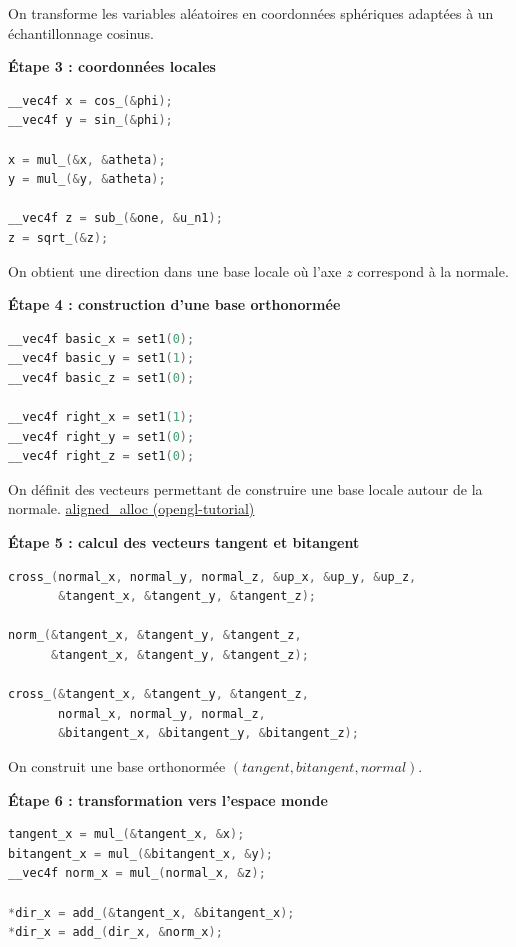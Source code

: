 On transforme les variables aléatoires en coordonnées sphériques adaptées à un échantillonnage cosinus.

\medskip

\textbf{Étape 3 : coordonnées locales}

\begin{lstlisting}[language=C]
__vec4f x = cos_(&phi);
__vec4f y = sin_(&phi);

x = mul_(&x, &atheta);
y = mul_(&y, &atheta);

__vec4f z = sub_(&one, &u_n1);
z = sqrt_(&z);
\end{lstlisting}

On obtient une direction dans une base locale où l'axe $z$ correspond à la normale.

\medskip

\textbf{Étape 4 : construction d'une base orthonormée}

\begin{lstlisting}[language=C]
__vec4f basic_x = set1(0);
__vec4f basic_y = set1(1);
__vec4f basic_z = set1(0);

__vec4f right_x = set1(1);
__vec4f right_y = set1(0);
__vec4f right_z = set1(0);
\end{lstlisting}

On définit des vecteurs permettant de construire une base locale autour de la normale.
\href{https://www.opengl-tutorial.org/fr/intermediate-tutorials/tutorial-13-normal-mapping/}{aligned\_alloc (opengl-tutorial)}

\medskip

\textbf{Étape 5 : calcul des vecteurs tangent et bitangent}

\begin{lstlisting}[language=C]
cross_(normal_x, normal_y, normal_z, &up_x, &up_y, &up_z,
       &tangent_x, &tangent_y, &tangent_z);

norm_(&tangent_x, &tangent_y, &tangent_z,
      &tangent_x, &tangent_y, &tangent_z);

cross_(&tangent_x, &tangent_y, &tangent_z,
       normal_x, normal_y, normal_z,
       &bitangent_x, &bitangent_y, &bitangent_z);
\end{lstlisting}

On construit une base orthonormée $(tangent, bitangent, normal)$.

\medskip

\textbf{Étape 6 : transformation vers l'espace monde}

\begin{lstlisting}[language=C]
tangent_x = mul_(&tangent_x, &x);
bitangent_x = mul_(&bitangent_x, &y);
__vec4f norm_x = mul_(normal_x, &z);

*dir_x = add_(&tangent_x, &bitangent_x);
*dir_x = add_(dir_x, &norm_x);
\end{lstlisting}


